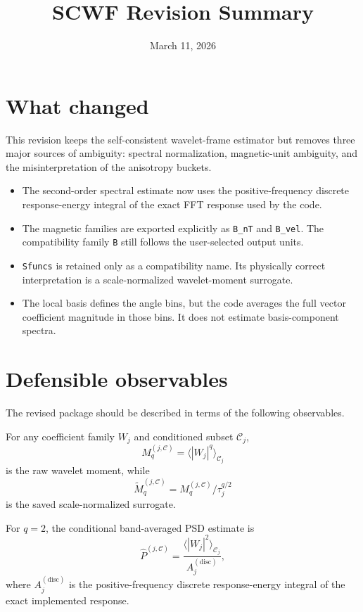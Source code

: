 \documentclass[11pt]{article}
\title{SCWF Revision Summary}
\author{}
\date{March 11, 2026}
\begin{document}
\maketitle

\section*{What changed}

This revision keeps the self-consistent wavelet-frame estimator but removes three
major sources of ambiguity: spectral normalization, magnetic-unit ambiguity, and the
misinterpretation of the anisotropy buckets.

\begin{itemize}[leftmargin=1.6em,itemsep=0.35em]
\item The second-order spectral estimate now uses the positive-frequency discrete
response-energy integral of the exact FFT response used by the code.
\item The magnetic families are exported explicitly as \texttt{B\_nT} and
\texttt{B\_vel}. The compatibility family \texttt{B} still follows the user-selected
output units.
\item \texttt{Sfuncs} is retained only as a compatibility name. Its physically correct
interpretation is a scale-normalized wavelet-moment surrogate.
\item The local basis defines the angle bins, but the code averages the full vector
coefficient magnitude in those bins. It does not estimate basis-component spectra.
\end{itemize}

\section*{Defensible observables}

The revised package should be described in terms of the following observables.

For any coefficient family $W_j$ and conditioned subset $\mathcal{C}_j$,
\begin{equation}
 M_q^{(j,\mathcal{C})} = \langle |W_j|^q \rangle_{\mathcal{C}_j}
\end{equation}
is the raw wavelet moment, while
\begin{equation}
 \widetilde{M}_q^{(j,\mathcal{C})} = M_q^{(j,\mathcal{C})} / \tau_j^{q/2}
\end{equation}
is the saved scale-normalized surrogate.

For $q=2$, the conditional band-averaged PSD estimate is
\begin{equation}
 \widehat{P}^{(j,\mathcal{C})} = \frac{\langle |W_j|^2 \rangle_{\mathcal{C}_j}}{A_j^{(\mathrm{disc})}},
\end{equation}
where $A_j^{(\mathrm{disc})}$ is the positive-frequency discrete response-energy
integral of the exact implemented response.
\end{document}
